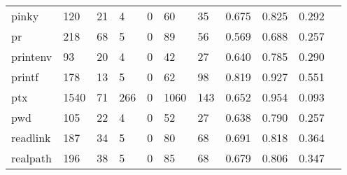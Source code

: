 \begin{longtable}{lp{1.10cm}p{1.10cm}p{1.10cm}p{1.10cm}p{1.10cm}p{1.10cm}p{1.10cm}p{1.10cm}p{1.10cm}p{1.10cm}}
pinky     &                    120 &                                 21 &                                 4 &                                0 &                                60 &                              35 &                          0.675 &                                 0.825 &                               0.292 \\
pr        &                    218 &                                 68 &                                 5 &                                0 &                                89 &                              56 &                          0.569 &                                 0.688 &                               0.257 \\
printenv  &                     93 &                                 20 &                                 4 &                                0 &                                42 &                              27 &                          0.640 &                                 0.785 &                               0.290 \\
printf    &                    178 &                                 13 &                                 5 &                                0 &                                62 &                              98 &                          0.819 &                                 0.927 &                               0.551 \\
ptx       &                   1540 &                                 71 &                               266 &                                0 &                              1060 &                             143 &                          0.652 &                                 0.954 &                               0.093 \\
pwd       &                    105 &                                 22 &                                 4 &                                0 &                                52 &                              27 &                          0.638 &                                 0.790 &                               0.257 \\
readlink  &                    187 &                                 34 &                                 5 &                                0 &                                80 &                              68 &                          0.691 &                                 0.818 &                               0.364 \\
realpath  &                    196 &                                 38 &                                 5 &                                0 &                                85 &                              68 &                          0.679 &                                 0.806 &                               0.347 \\

\end{longtable}
